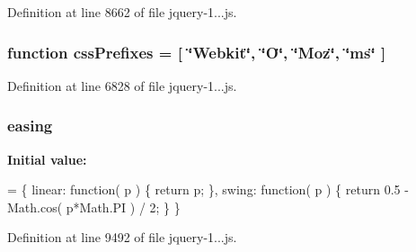Definition at line 8662 of file jquery-\/1...\+js.

\subsubsection[{\texorpdfstring{css\+Prefixes}{cssPrefixes}}]{\setlength{\rightskip}{0pt plus 5cm}function css\+Prefixes = \mbox{[} \char`\"{}Webkit\char`\"{}, \char`\"{}O\char`\"{}, \char`\"{}Moz\char`\"{}, \char`\"{}ms\char`\"{} \mbox{]}}\hypertarget{obj_2_release_2_package_2_package_tmp_2_scripts_2jquery-1_810_82_8js_a2ed3892172b336458b8074254f4471da}{}\label{obj_2_release_2_package_2_package_tmp_2_scripts_2jquery-1_810_82_8js_a2ed3892172b336458b8074254f4471da}


Definition at line 6828 of file jquery-\/1...\+js.

\subsubsection[{\texorpdfstring{easing}{easing}}]{ easing}\hypertarget{obj_2_release_2_package_2_package_tmp_2_scripts_2jquery-1_810_82_8js_a9758a312629fa6de1744280dd6e6253b}{}\label{obj_2_release_2_package_2_package_tmp_2_scripts_2jquery-1_810_82_8js_a9758a312629fa6de1744280dd6e6253b}
{\bfseries Initial value\+:}
\begin{DoxyCode}
= \{
    linear: \textcolor{keyword}{function}( p ) \{
        \textcolor{keywordflow}{return} p;
    \},
    swing: \textcolor{keyword}{function}( p ) \{
        \textcolor{keywordflow}{return} 0.5 - Math.cos( p*Math.PI ) / 2;
    \}
\}
\end{DoxyCode}


Definition at line 9492 of file jquery-\/1...\+js.

